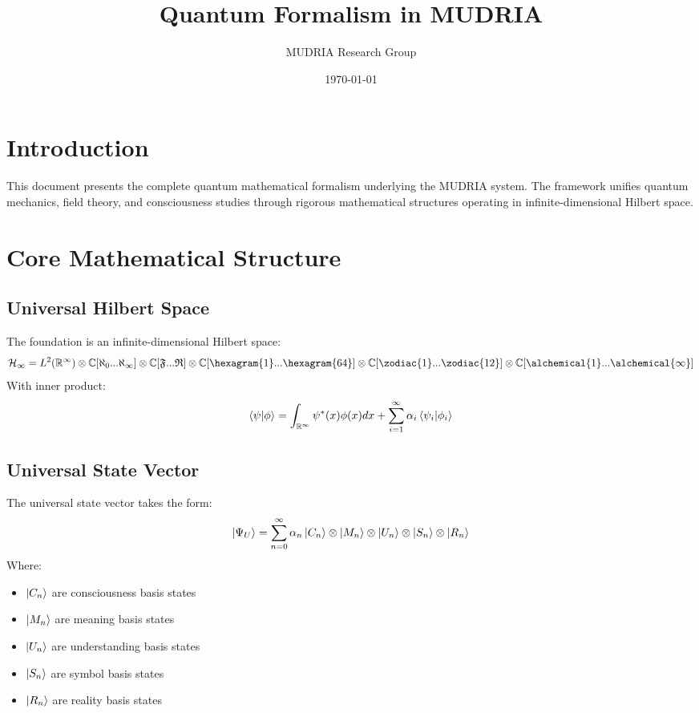 \documentclass[12pt]{article}
\title{Quantum Formalism in MUDRIA}
\author{MUDRIA Research Group}
\date{\today}
\begin{document}
\maketitle
\section{Introduction}
This document presents the complete quantum mathematical formalism underlying the MUDRIA system. The framework unifies quantum mechanics, field theory, and consciousness studies through rigorous mathematical structures operating in infinite-dimensional Hilbert space.
\section{Core Mathematical Structure}
\subsection{Universal Hilbert Space}
The foundation is an infinite-dimensional Hilbert space:
\begin{equation}
\mathcal{H}_\infty = L^2(\mathbb{R}^\infty) \otimes \mathbb{C}[\aleph_0...\aleph_\infty] \otimes \mathbb{C}[\mathfrak{F}...\mathfrak{R}] \otimes \mathbb{C}[\hexagram{1}...\hexagram{64}] \otimes \mathbb{C}[\zodiac{1}...\zodiac{12}] \otimes \mathbb{C}[\alchemical{1}...\alchemical{\infty}]
\end{equation}
With inner product:
\begin{equation}
\braket{\psi|\phi} = \int_{\mathbb{R}^\infty} \psi^*(x)\phi(x)dx + \sum_{i=1}^\infty \alpha_i\braket{\psi_i|\phi_i}
\end{equation}
\subsection{Universal State Vector}
The universal state vector takes the form:
\begin{equation}
\ket{\Psi_U} = \sum_{n=0}^\infty \alpha_n\ket{C_n} \otimes \ket{M_n} \otimes \ket{U_n} \otimes \ket{S_n} \otimes \ket{R_n}
\end{equation}
Where:
\begin{itemize}
\item $\ket{C_n}$ are consciousness basis states
\item $\ket{M_n}$ are meaning basis states
\item $\ket{U_n}$ are understanding basis states 
\item $\ket{S_n}$ are symbol basis states
\item $\ket{R_n}$ are reality basis states
\end{itemize}
\end{document}
